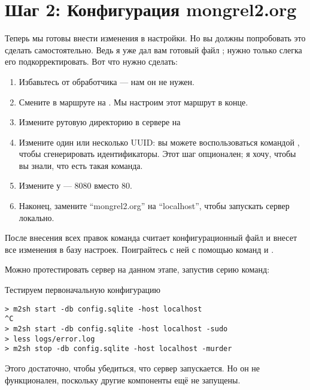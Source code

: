 \section{Шаг 2: Конфигурация mongrel2.org}

Теперь мы готовы внести изменения в настройки. Но вы должны попробовать это
сделать самостоятельно. Ведь я уже дал вам готовый файл ;
нужно только слегка его подкорректировать. Вот что нужно сделать:

\begin{enumerate}
\item Избавьтесь от обработчика  --- нам он не нужен.
\item Смените  в маршруте  на
    . Мы настроим этот маршрут в конце.
\item Измените рутовую директорию  в сервере на
\item Измените один или несколько UUID: вы можете воспользоваться командой
    , чтобы сгенерировать идентификаторы. Этот шаг
    опционален; я хочу, чтобы вы знали, что есть такая команда.
\item Измените  у  --- 8080 вместо 80.
\item Наконец, замените ``mongrel2.org'' на ``localhost'', чтобы запускать сервер локально.
\end{enumerate}

После внесения всех правок команда  считает конфигурационный файл и внесет все изменения в базу
настроек. Поиграйтесь с ней с помощью команд  и .

Можно протестировать сервер на данном этапе, запустив серию команд:

\begin{code}{Тестируем первоначальную конфигурацию}
\begin{lstlisting}
> m2sh start -db config.sqlite -host localhost
^C
> m2sh start -db config.sqlite -host localhost -sudo
> less logs/error.log
> m2sh stop -db config.sqlite -host localhost -murder
\end{lstlisting}
\end{code}

Этого достаточно, чтобы убедиться, что сервер запускается. Но он не
функционален, поскольку другие компоненты ещё не запущены.


